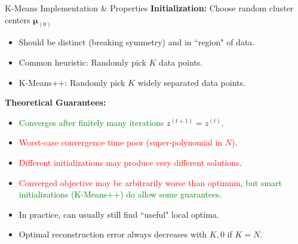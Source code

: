 \documentclass[10pt,mathserif]{beamer}
\begin{document}
\begin{frame}{K-Means Implementation \& Properties}
\textbf{Initialization:} Choose random cluster centers $\bm{\mu}_{(0)}$
\begin{itemize}
    \item Should be distinct (breaking symmetry) and in ``region" of data.
    \item Common heuristic: Randomly pick $K$ data points.
    \item K-Means++: Randomly pick $K$ widely separated data points.
\end{itemize}
\textbf{Theoretical Guarantees:}
\begin{itemize}
    \item \textcolor{green}{Converges after finitely many iterations} $z^{(t+1)} = z^{(t)}$.
    \item \textcolor{red}{Worst-case convergence time poor (super-polynomial in $N$)}.
    \item \textcolor{red}{Different initializations may produce very different solutions}.
    \item \textcolor{red}{Converged objective may be arbitrarily worse than optimum}, \textcolor{green}{but smart initializations (K-Means++) do allow some guarantees}.
    \item In practice, can usually still find ``useful" local optima.
    \item Optimal reconstruction error always decreases with $K, 0$ if $K=N$.
\end{itemize}
\end{frame}
\end{document}
